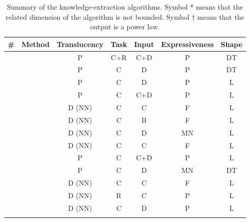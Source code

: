 
\newcommand{\myhead}{
	\textbf{\#} & \textbf{Method} & \textbf{Translucency} & \textbf{Task} & \textbf{Input} & \textbf{Expressiveness} & \textbf{Shape} 
    \\\hline\hline
}

\setcounter{SkeMethod}{1}
\newcommand{\newSkeMethodIndex}{\theSkeMethod\stepcounter{SkeMethod}}

\begin{scriptsize}
\begin{longtable}{c|p{3cm}|c|c|c|c|c}
    \caption{
        Summary of the knowledge-extraction algorithms.
        Symbol $*$ means that the related dimension of the algorithm is not bounded.
        Symbol $\dagger$ means that the output is a power law.
    }
    \label{tab:ske-taxonomy}
    \\
    \myhead
    \newSkeMethodIndex & \cite{breiman1984classification} & P & C+R & C+D & P & DT 
    \\\hdashline
    \newSkeMethodIndex & \cite{Quinlan86ID3} & P & C & D & P & DT 
    \\\hdashline
    \newSkeMethodIndex & \cite{SaitoN88} & P & C & D & P & L 
    \\\hdashline
    \newSkeMethodIndex & \cite{ClarkN89} & P & C & C+D & P & L 
    \\\hline
    \newSkeMethodIndex & \cite{Masuoka1990} & D (NN) & C & C & F & L 
    \\\hdashline
    \newSkeMethodIndex & \cite{Hayashi90} & D (NN) & C & B & F & L 
    \\\hdashline
    \newSkeMethodIndex & \cite{TowellS91} & D (NN) & C & D & MN & L 
    \\\hdashline
    \newSkeMethodIndex & \cite{Berenji91} & D (NN) & C & C & F & L 
    \\\hdashline
    \newSkeMethodIndex & \cite{BrunkP91} & P & C & C+D & P & L 
    \\\hdashline
    \newSkeMethodIndex & \cite{murphy1991id2} & P & C & D & MN & DT 
    \\\hdashline
    \newSkeMethodIndex & \cite{HorikawaFU92} & D (NN) & C & C & F & L 
    \\\hdashline
    \newSkeMethodIndex & \cite{TrespHA92} & D (NN) & R & C & P & L 
    \\\hdashline
    \newSkeMethodIndex & \cite{towell1993extracting} & D (NN) & C & D & P & L 
    \\\hdashline

\end{longtable}
\end{scriptsize}
